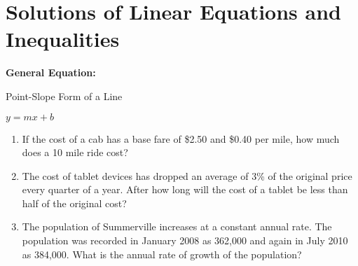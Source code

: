 \section[Linear Equations]{Solutions of Linear Equations and Inequalities}

\textbf{General Equation:}

\begin{center}
Point-Slope Form of a Line

$y=mx+b$
\end{center}

\vfill
\begin{enumerate}[labelindent=*,style=multiline,leftmargin=*,label=\textbf{Example \arabic*:}]
\item If the cost of a cab has a base fare of \$2.50 and \$0.40 per mile, how much does a 10 mile ride cost?

\vfill\item The cost of tablet devices has dropped an average of 3\% of the original price every quarter of a year. After how long will the cost of a tablet be less than half of the original cost?

\vfill\item The population of Summerville increases at a constant annual rate. The population was recorded in January 2008 as 362,000 and again in July 2010 as 384,000. What is the annual rate of growth of the population?
\end{enumerate}

